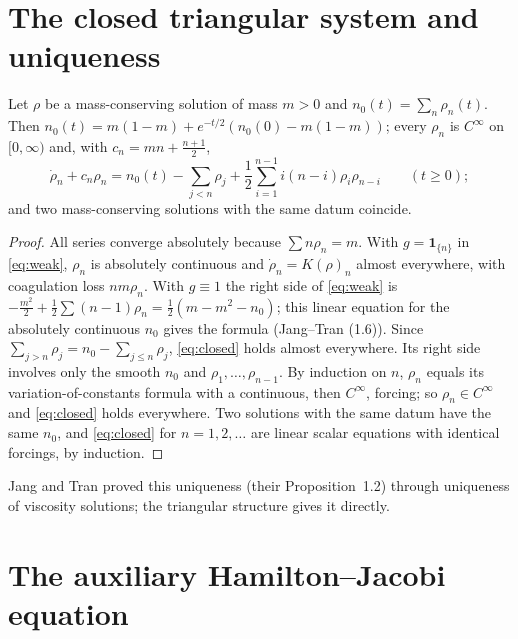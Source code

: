 \documentclass[11pt,a4paper]{report}
\begin{document}
\section{The closed triangular system and uniqueness}\label{sec:closed}

\begin{proposition}\label{prop:closed}
Let \(\rho\) be a mass-conserving solution of mass \(m>0\) and \(n_0(t)=\sum_n\rho_n(t)\). Then
\(n_0(t)=m(1-m)+e^{-t/2}(n_0(0)-m(1-m))\); every \(\rho_n\) is \(C^\infty\) on \([0,\infty)\) and, with
\(c_n=mn+\frac{n+1}{2}\),
\begin{equation}\label{eq:closed}
\dot\rho_n+c_n\rho_n=n_0(t)-\sum_{j<n}\rho_j+\frac12\sum_{i=1}^{n-1}i(n-i)\rho_i\rho_{n-i}
\qquad(t\ge0);
\end{equation}
and two mass-conserving solutions with the same datum coincide.
\end{proposition}
\begin{proof}
All series converge absolutely because \(\sum n\rho_n=m\). With \(g=\mathbf 1_{\{n\}}\) in \eqref{eq:weak},
\(\rho_n\) is absolutely continuous and \(\dot\rho_n=K(\rho)_n\) almost everywhere, with coagulation loss
\(nm\rho_n\). With \(g\equiv1\) the right side of \eqref{eq:weak} is
\(-\frac{m^2}2+\frac12\sum(n-1)\rho_n=\frac12(m-m^2-n_0)\); this linear equation for the absolutely
continuous \(n_0\) gives the formula (Jang--Tran (1.6)). Since \(\sum_{j>n}\rho_j=n_0-\sum_{j\le n}\rho_j\),
\eqref{eq:closed} holds almost everywhere. Its right side involves only the smooth \(n_0\) and
\(\rho_1,\dots,\rho_{n-1}\). By induction on \(n\), \(\rho_n\) equals its variation-of-constants formula with
a continuous, then \(C^\infty\), forcing; so \(\rho_n\in C^\infty\) and \eqref{eq:closed} holds everywhere.
Two solutions with the same datum have the same \(n_0\), and \eqref{eq:closed} for \(n=1,2,\dots\) are linear
scalar equations with identical forcings, by induction.
\end{proof}

Jang and Tran proved this uniqueness (their Proposition~1.2) through uniqueness of viscosity solutions; the
triangular structure gives it directly.

\section{The auxiliary Hamilton--Jacobi equation}\label{sec:HJ}
\end{document}

